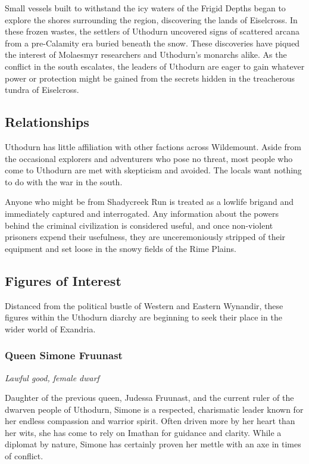 \documentclass[10pt,a4paper,twoside,bg=print,twocolumn,openany,nodeprecatedcode]{dndbook}
\begin{document}
Small vessels built to withstand the icy waters of the Frigid Depths began to explore the shores surrounding the region, discovering the lands of Eiselcross. In these frozen wastes, the settlers of Uthodurn uncovered signs of scattered arcana from a pre-Calamity era buried beneath the snow. These discoveries have piqued the interest of Molaesmyr researchers and Uthodurn's monarchs alike. As the conflict in the south escalates, the leaders of Uthodurn are eager to gain whatever power or protection might be gained from the secrets hidden in the treacherous tundra of Eiselcross.

\subsection{Relationships}
Uthodurn has little affiliation with other factions across Wildemount. Aside from the occasional explorers and adventurers who pose no threat, most people who come to Uthodurn are met with skepticism and avoided. The locals want nothing to do with the war in the south.

Anyone who might be from Shadycreek Run is treated as a lowlife brigand and immediately captured and interrogated. Any information about the powers behind the criminal civilization is considered useful, and once non-violent prisoners expend their usefulness, they are unceremoniously stripped of their equipment and set loose in the snowy fields of the Rime Plains.

\subsection{Figures of Interest}
Distanced from the political bustle of Western and Eastern Wynandir, these figures within the Uthodurn diarchy are beginning to seek their place in the wider world of Exandria.

\subsubsection{Queen Simone Fruunast}
\textit{Lawful good, female dwarf}

Daughter of the previous queen, Judessa Fruunast, and the current ruler of the dwarven people of Uthodurn, Simone is a respected, charismatic leader known for her endless compassion and warrior spirit. Often driven more by her heart than her wits, she has come to rely on Imathan for guidance and clarity. While a diplomat by nature, Simone has certainly proven her mettle with an axe in times of conflict.
\end{document}
